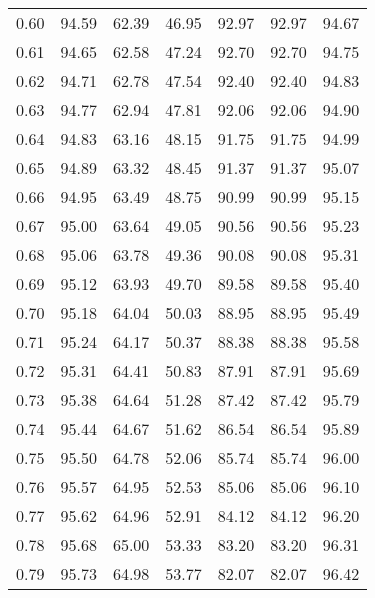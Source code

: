 \begin{tabular}{|c|c|c|c|c|c|c|}
      0.60 &     94.59 &     62.39 &      46.95 &   92.97 &      92.97 &         94.67 \\
      0.61 &     94.65 &     62.58 &      47.24 &   92.70 &      92.70 &         94.75 \\
      0.62 &     94.71 &     62.78 &      47.54 &   92.40 &      92.40 &         94.83 \\
      0.63 &     94.77 &     62.94 &      47.81 &   92.06 &      92.06 &         94.90 \\
      0.64 &     94.83 &     63.16 &      48.15 &   91.75 &      91.75 &         94.99 \\
      0.65 &     94.89 &     63.32 &      48.45 &   91.37 &      91.37 &         95.07 \\
      0.66 &     94.95 &     63.49 &      48.75 &   90.99 &      90.99 &         95.15 \\
      0.67 &     95.00 &     63.64 &      49.05 &   90.56 &      90.56 &         95.23 \\
      0.68 &     95.06 &     63.78 &      49.36 &   90.08 &      90.08 &         95.31 \\
      0.69 &     95.12 &     63.93 &      49.70 &   89.58 &      89.58 &         95.40 \\
      0.70 &     95.18 &     64.04 &      50.03 &   88.95 &      88.95 &         95.49 \\
      0.71 &     95.24 &     64.17 &      50.37 &   88.38 &      88.38 &         95.58 \\
      0.72 &     95.31 &     64.41 &      50.83 &   87.91 &      87.91 &         95.69 \\
      0.73 &     95.38 &     64.64 &      51.28 &   87.42 &      87.42 &         95.79 \\
      0.74 &     95.44 &     64.67 &      51.62 &   86.54 &      86.54 &         95.89 \\
      0.75 &     95.50 &     64.78 &      52.06 &   85.74 &      85.74 &         96.00 \\
      0.76 &     95.57 &     64.95 &      52.53 &   85.06 &      85.06 &         96.10 \\
      0.77 &     95.62 &     64.96 &      52.91 &   84.12 &      84.12 &         96.20 \\
      0.78 &     95.68 &     65.00 &      53.33 &   83.20 &      83.20 &         96.31 \\
      0.79 &     95.73 &     64.98 &      53.77 &   82.07 &      82.07 &         96.42 \\

\end{tabular}
